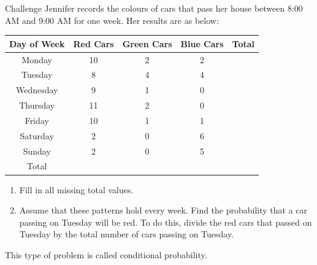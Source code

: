 \documentclass[12pt,letterpaper]{article}
\begin{document}
\begin{problem}{Challenge}
 Jennifer records the colours of cars that pass her house between 8:00 AM and
 9:00 AM for one week. Her results are as below:
 \vspace{0.5cm}
 \renewcommand{\arraystretch}{1.2}

 \begin{center}
  \begin{tabular}{|c|c|c|c|c|}
  \hline
  Day of Week & Red Cars & Green Cars & Blue Cars & Total \\ \hline
  Monday & 10 & 2 & 2 & \hspace{4cm} \\
  Tuesday & 8 & 4 & 4 & \\
  Wednesday & 9 & 1 & 0 & \\
  Thursday & 11 & 2 & 0 & \\
  Friday & 10 & 1 & 1 & \\
  Saturday & 2 & 0 & 6 & \\
  Sunday & 2 & 0 & 5 & \\ \hline
  Total & & & & \\ \hline
  \end{tabular}
 \end{center}

 \begin{enumerate}
  \item Fill in all missing total values.
  \item Assume that these patterns hold every week. Find the probability that a
  car passing on Tuesday will be red. To do this, divide the red cars that
  passed on Tuesday by the total number of cars passing on Tuesday.
 \end{enumerate}

 This type of problem is called conditional probability.

\end{problem}
\end{document}

